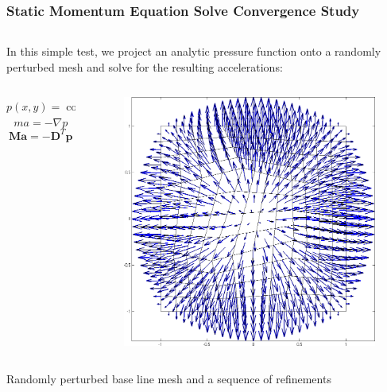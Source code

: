 \documentclass[8pt,xcolor=svgnames]{beamer}
\begin{document}
\begin{frame}
 \frametitle{Static Momentum Equation Solve Convergence Study}
 \begin{columns}
  \begin{column}{0.6\textwidth}
   In this simple test, we project an analytic pressure function
    onto a randomly perturbed mesh and solve for the
    resulting accelerations:
    \begin{columns}
    \begin{column}{0.6\textwidth}
    \[
     p(x,y)=\cos(\dfrac{\pi}{2}x)\cos(\dfrac{\pi}{2}y)
    \]
    \[
     ma=-\nabla p
    \]
    \[
     \mathbf{Ma}=-\mathbf{D}^T\mathbf{p}
    \]
    \end{column}
    \begin{column}{0.4\textwidth}
    \begin{figure}[h!]
    \centering
    \includegraphics[width=1.0\textwidth,keepaspectratio=true]{./Images/GradPMesh_Acceleration_h2.png}
    \end{figure}
    \smallskip
    \end{column}
    \end{columns}
    Randomly perturbed base line mesh and a sequence of refinements
    \begin{columns}

\end{columns}
\end{column}
\end{columns}
\end{frame}
\end{document}
